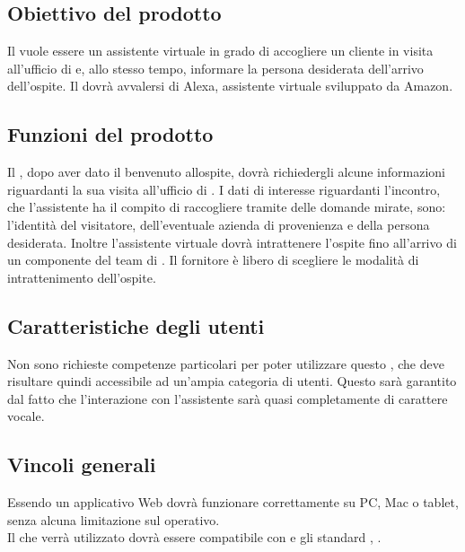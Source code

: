\subsection{Obiettivo del prodotto}
Il  vuole essere un assistente virtuale in grado di accogliere un cliente in visita all'ufficio di \PROPONENTE{} e, allo stesso tempo, informare la persona desiderata dell'arrivo dell'ospite. Il  dovrà avvalersi di Alexa, assistente virtuale sviluppato da Amazon.
\subsection{Funzioni del prodotto}
Il , dopo aver dato il benvenuto allospite, dovrà richiedergli alcune informazioni riguardanti la sua visita all'ufficio di \PROPONENTE. 
I dati di interesse riguardanti l'incontro, che l'assistente ha il compito di raccogliere tramite delle domande mirate, sono: l'identità del visitatore, dell'eventuale azienda di provenienza e della persona desiderata. Inoltre l'assistente virtuale dovrà intrattenere l'ospite fino all'arrivo di un componente del team di \PROPONENTE{}. Il fornitore è libero di scegliere le modalità di intrattenimento dell'ospite.  
\subsection{Caratteristiche degli utenti}
Non sono richieste competenze particolari per poter utilizzare questo , che deve risultare
quindi accessibile ad un'ampia categoria di utenti. Questo sarà garantito dal fatto che l'interazione con l'assistente sarà quasi completamente di carattere vocale.
\subsection{Vincoli generali}
Essendo un applicativo Web dovrà funzionare correttamente su PC, Mac o tablet, senza alcuna limitazione sul  operativo.\\
Il  che verrà utilizzato dovrà essere compatibile con  e gli standard , .